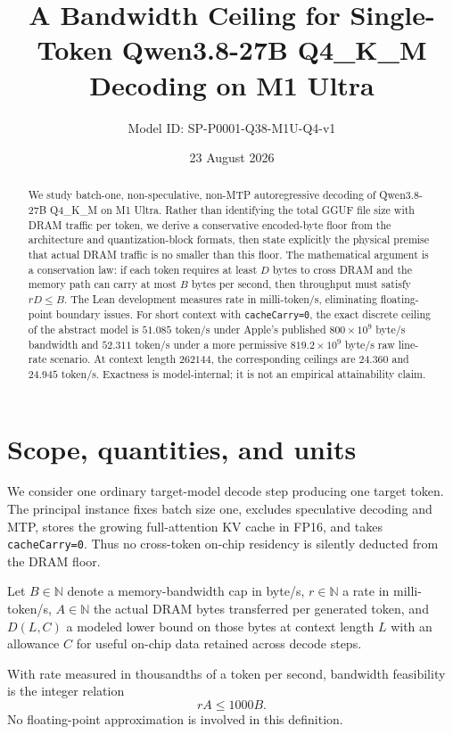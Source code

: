 \documentclass[11pt,a4paper]{article}
\title{A Bandwidth Ceiling for Single-Token Qwen3.8-27B Q4\_K\_M Decoding on M1 Ultra}
\author{Model ID: SP-P0001-Q38-M1U-Q4-v1}
\date{23 August 2026}
\begin{document}
\maketitle

\begin{abstract}
We study batch-one, non-speculative, non-MTP autoregressive decoding of Qwen3.8-27B Q4\_K\_M on M1 Ultra. Rather than identifying the total GGUF file size with DRAM traffic per token, we derive a conservative encoded-byte floor from the architecture and quantization-block formats, then state explicitly the physical premise that actual DRAM traffic is no smaller than this floor. The mathematical argument is a conservation law: if each token requires at least $D$ bytes to cross DRAM and the memory path can carry at most $B$ bytes per second, then throughput must satisfy $rD\le B$. The Lean development measures rate in milli-token/s, eliminating floating-point boundary issues. For short context with \texttt{cacheCarry=0}, the exact discrete ceiling of the abstract model is $51.085$ token/s under Apple's published $800\times10^9$ byte/s bandwidth and $52.311$ token/s under a more permissive $819.2\times10^9$ byte/s raw line-rate scenario. At context length $262144$, the corresponding ceilings are $24.360$ and $24.945$ token/s. Exactness is model-internal; it is not an empirical attainability claim.
\end{abstract}

\section{Scope, quantities, and units}

We consider one ordinary target-model decode step producing one target token. The principal instance fixes batch size one, excludes speculative decoding and MTP, stores the growing full-attention KV cache in FP16, and takes \texttt{cacheCarry=0}. Thus no cross-token on-chip residency is silently deducted from the DRAM floor.

Let $B\in\mathbb N$ denote a memory-bandwidth cap in byte/s, $r\in\mathbb N$ a rate in milli-token/s, $A\in\mathbb N$ the actual DRAM bytes transferred per generated token, and $D(L,C)$ a modeled lower bound on those bytes at context length $L$ with an allowance $C$ for useful on-chip data retained across decode steps.

With rate measured in thousandths of a token per second, bandwidth feasibility is the integer relation
\begin{equation}
  rA\le1000B.
  \label{eq:feasible}
\end{equation}
No floating-point approximation is involved in this definition.
\end{document}
